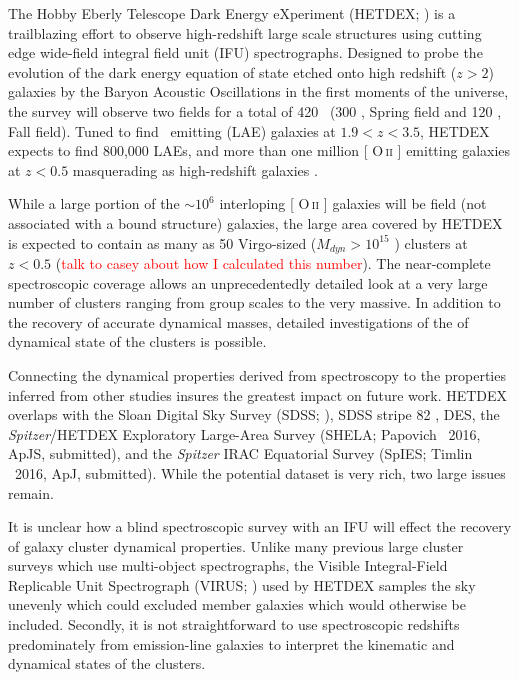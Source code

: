 \documentclass[fleqn,usenatbib]{mnras}
\makeatletter
\newcommand{\editorial}[1]{\textcolor{red}{#1}}
\DeclareRobustCommand{\ion}[2]{%
\relax\ifmmode
\ifx\testbx\f@series
{\mathbf{#1\,\mathsc{#2}}}\else
{\mathrm{#1\,\mathsc{#2}}}\fi
\else\textup{#1\,{\mdseries\textsc{#2}}}%
\fi}
\makeatother
\begin{document}
The Hobby Eberly Telescope Dark Energy eXperiment (HETDEX; \citealt{Hill2008}) is a trailblazing effort to observe high-redshift large scale structures using cutting edge wide-field integral field unit (IFU) spectrographs. Designed to probe the evolution of the dark energy equation of state etched onto high redshift ($z>2$) galaxies by the Baryon Acoustic Oscillations \citep{Eisenstein2005} in the first moments of the universe, the survey will observe two fields for a total of 420 \degsq\ (300 \degsq, Spring field and 120 \degsq, Fall field). Tuned to find \lya\ emitting (LAE) galaxies at $1.9<z<3.5$, HETDEX expects to find 800,000 LAEs, and more than one million [\ion{O}{ii}] emitting galaxies at $z<0.5$ masquerading as high-redshift galaxies \citep{Acquaviva2014}. 

While a large portion of the $\sim10^6$ interloping [\ion{O}{ii}] galaxies will be field (not associated with a bound structure) galaxies, the large area covered by HETDEX is expected to contain as many as 50 Virgo-sized ($M_{dyn}>10^{15}$ \msol) clusters at $z<0.5$ (\editorial{talk to casey about how I calculated this number}). The near-complete spectroscopic coverage allows an unprecedentedly detailed look at a very large number of clusters ranging from group scales to the very massive. In addition to the recovery of accurate dynamical masses, detailed investigations of the of dynamical state of the clusters is possible. 

Connecting the dynamical properties derived from spectroscopy to the properties inferred from other studies insures the greatest impact on future work. HETDEX overlaps with the Sloan Digital Sky Survey (SDSS; \citealt{Blanton2001a}), SDSS stripe 82 \citep{Annis2014}, DES, the \emph{Spitzer}/HETDEX Exploratory Large-Area Survey (SHELA; Papovich \etal\ 2016, ApJS, submitted), and the \emph{Spitzer} IRAC Equatorial Survey (SpIES; Timlin \etal\ 2016, ApJ, submitted). While the potential dataset is very rich, two large issues remain.

It is unclear how a blind spectroscopic survey with an IFU will effect the recovery of galaxy cluster dynamical properties. Unlike many previous large cluster surveys  which use multi-object spectrographs, the Visible Integral-Field Replicable Unit Spectrograph (VIRUS; \citealt{Hill2012}) used by HETDEX samples the sky unevenly which could excluded member galaxies which would otherwise be included. Secondly, it is not straightforward to use spectroscopic redshifts predominately from emission-line galaxies to interpret the kinematic and dynamical states of the clusters.
\end{document}
